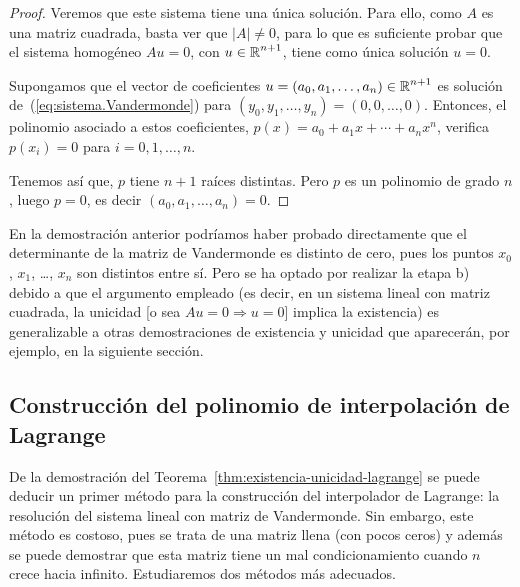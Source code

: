 \begin{proof}
    Veremos que
  este sistema tiene una única solución. Para ello, como $A$ es una
  matriz cuadrada, basta ver que $|A|\neq 0$, para lo que es suficiente
  probar que el sistema homogéneo $Au=0$, con $u\in\operatorname{{\mathbb R}}^{n+1}$, tiene
  como única solución $u=0$.

  Supongamos que el vector de coeficientes
  $u=(a_0,a_1,\dots,a_n) \in\operatorname{{\mathbb R}}^{n+1}$ es solución
  de~(\ref{eq:sistema.Vandermonde}) para
  $(y_0,y_1,\dots,y_n)=(0,0,\dots,0)$. Entonces, el polinomio
  asociado a estos coeficientes,
  $p(x)=a_0 + a_1x + \cdots + a_n x^n$, verifica $p(x_i)=0$ para
  $i=0,1,\dots,n$.

  Tenemos así que, $p$ tiene $n+1$ raíces distintas. Pero
  $p$ es un polinomio de grado $n$, luego $p=0$, es decir
  $(a_0,a_1,\dots,a_n)=0$.
\end{proof}

\begin{remark}
  \label{rk:1}
  En la demostración anterior podríamos haber probado directamente
  que el determinante de la matriz de Vandermonde es distinto de cero,
  pues los puntos $x_0$, $x_1$, \dots, $x_n$ son distintos
  entre sí. Pero se ha optado por realizar la etapa b) debido a que el
  argumento empleado (es decir, en un sistema lineal con matriz
  cuadrada, la unicidad [o sea $Au=0 \Rightarrow u=0$] implica la existencia)
  es generalizable a otras demostraciones de existencia y unicidad que
  aparecerán, por ejemplo, en la siguiente sección.
\end{remark}

\subsection{Construcción del polinomio de interpolación de Lagrange}
\label{sec:construcion--polinomio-lagrange}

De la demostración del Teorema~\ref{thm:existencia-unicidad-lagrange}
se puede deducir un primer método para la construcción del
interpolador de Lagrange: la resolución del sistema lineal con matriz
de Vandermonde. Sin embargo, este método es costoso, pues se trata de
una matriz llena (con pocos ceros) y además se puede demostrar que
esta matriz tiene un mal condicionamiento cuando $n$ crece hacia
infinito. Estudiaremos dos métodos más adecuados.

